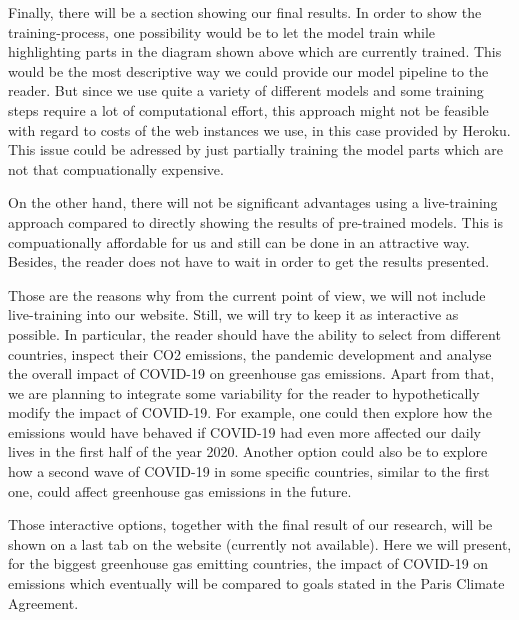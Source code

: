Finally, there will be a section showing our final results. In order to show the training-process, one possibility would be to let the model train while highlighting parts in the diagram shown above which are currently trained. This would be the most descriptive way we could provide our model pipeline to the reader. But since we use quite a variety of different models and some training steps require a lot of computational effort, this approach might not be feasible with regard to costs of the web instances we use, in this case provided by Heroku. This issue could be adressed by just partially training the model parts which are not that compuationally expensive.

On the other hand, there will not be significant advantages using a live-training approach compared to directly showing the results of pre-trained models. This is compuationally affordable for us and still can be done in an attractive way. Besides, the reader does not have to wait in order to get the results presented.

Those are the reasons why from the current point of view, we will not include live-training into our website. Still, we will try to keep it as interactive as possible. In particular, the reader should have the ability to select from different countries, inspect their CO2 emissions, the pandemic development and analyse the overall impact of COVID-19 on greenhouse gas emissions. Apart from that, we are planning to integrate some variability for the reader to hypothetically modify the impact of COVID-19. For example, one could then explore how the emissions would have behaved if COVID-19 had even more affected our daily lives in the first half of the year 2020. Another option could also be to explore how a second wave of COVID-19 in some specific countries, similar to the first one, could affect greenhouse gas emissions in the future.

Those interactive options, together with the final result of our research, will be shown on a last tab on the website (currently not available). Here we will present, for the biggest greenhouse gas emitting countries, the impact of COVID-19 on emissions which eventually will be compared to goals stated in the Paris Climate Agreement.


